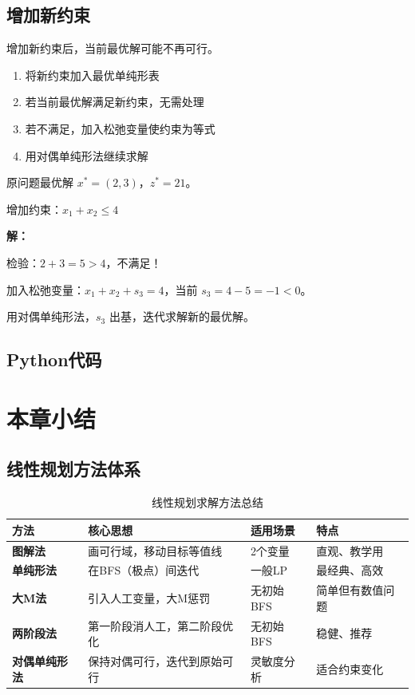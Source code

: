 \subsection{增加新约束}

增加新约束后，当前最优解可能不再可行。

\begin{algobox}[增加新约束的处理]
\begin{enumerate}
    \item 将新约束加入最优单纯形表
    \item 若当前最优解满足新约束，无需处理
    \item 若不满足，加入松弛变量使约束为等式
    \item 用对偶单纯形法继续求解
\end{enumerate}
\end{algobox}

\begin{example}[增加新约束]
原问题最优解 $x^* = (2, 3)$，$z^* = 21$。

增加约束：$x_1 + x_2 \leq 4$

\textbf{解：}

检验：$2 + 3 = 5 > 4$，不满足！

加入松弛变量：$x_1 + x_2 + s_3 = 4$，当前 $s_3 = 4 - 5 = -1 < 0$。

用对偶单纯形法，$s_3$ 出基，迭代求解新的最优解。
\end{example}

\subsection{Python代码}\label{sec:sensitivity-code}

\section{本章小结}\label{sec:ch2-summary}

\subsection{线性规划方法体系}

\begin{table}[H]
\centering
\caption{线性规划求解方法总结}
\begin{tabular}{@{}p{3cm}p{4cm}p{3cm}p{3cm}@{}}
\toprule
\textbf{方法} & \textbf{核心思想} & \textbf{适用场景} & \textbf{特点} \\
\midrule
\textbf{图解法} & 画可行域，移动目标等值线 & 2个变量 & 直观、教学用 \\
\midrule
\textbf{单纯形法} & 在BFS（极点）间迭代 & 一般LP & 最经典、高效 \\
\midrule
\textbf{大M法} & 引入人工变量，大M惩罚 & 无初始BFS & 简单但有数值问题 \\
\midrule
\textbf{两阶段法} & 第一阶段消人工，第二阶段优化 & 无初始BFS & 稳健、推荐 \\
\midrule
\textbf{对偶单纯形法} & 保持对偶可行，迭代到原始可行 & 灵敏度分析 & 适合约束变化 \\
\bottomrule
\end{tabular}
\end{table}

